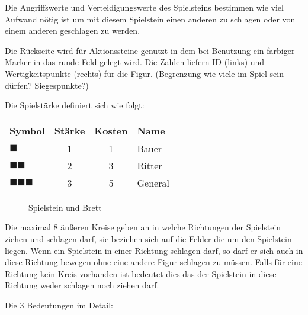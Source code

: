 \documentclass{article}
\begin{document}
	Die Angriffswerte und Verteidigungswerte des Spielsteins bestimmen wie viel Aufwand nötig ist um mit diesem Spielstein einen anderen zu schlagen oder von einem anderen geschlagen zu werden.

	Die Rückseite wird für Aktionssteine genutzt in dem bei Benutzung ein farbiger Marker in das runde Feld gelegt wird. Die Zahlen liefern ID (links) und Wertigkeitspunkte (rechts) für die Figur. (Begrenzung wie viele im Spiel sein dürfen? Siegespunkte?)
	\\

	\begin{flushleft}
	Die Spielstärke definiert sich wie folgt:	
	
	\begin{tabular}{lccl}
	\hline
	Symbol 									& Stärke & Kosten & Name \\ \hline 
	$\blacksquare $ 							& 1 & 1 & Bauer \\ 
	$\blacksquare\blacksquare$ 				& 2 & 3 & Ritter \\ 
	$\blacksquare\blacksquare\blacksquare$  & 3 & 5 & General \\ 
	\end{tabular}
	\end{flushleft}
	
	
	\begin{wrapfigure}{r}{6.2cm}
  	\caption{Spielstein und Brett}
	\end{wrapfigure}
	
	Die maximal 8 äußeren Kreise geben an in welche Richtungen der Spielstein ziehen und 
	schlagen darf, sie beziehen sich auf die Felder die um den Spielstein liegen.
	Wenn ein Spielstein in einer Richtung schlagen darf, so darf er sich auch in 
	diese Richtung bewegen ohne eine andere Figur schlagen zu müssen. Falls für eine
	Richtung kein Kreis vorhanden ist bedeutet dies das der Spielstein in diese Richtung
	weder schlagen noch ziehen darf. 
	
	
	
	\vspace{0.2cm}
	
	\begin{flushleft}
	Die 3 Bedeutungen im Detail: 
	\end{flushleft}
	
	\vspace{0.2cm}
	
\end{document}
